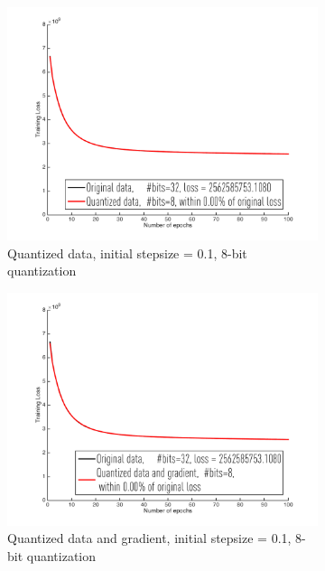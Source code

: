 \documentclass{article}
\begin{document}
\begin{figure}[h]
    \begin{subfigure}[h]{.3\columnwidth}
    \includegraphics[width=\columnwidth]{lr/real/cadata/8d01}
    \caption{Quantized data, initial stepsize = 0.1, 8-bit quantization}
    \end{subfigure}
    \begin{subfigure}[h]{.3\columnwidth}
    \includegraphics[width=\columnwidth]{lr/real/cadata/8dg01}
    \caption{Quantized data and gradient, initial stepsize = 0.1, 8-bit quantization}
    \end{subfigure}
    \begin{subfigure}[h]{.3\columnwidth}

\end{subfigure}
\end{figure}
\end{document}
